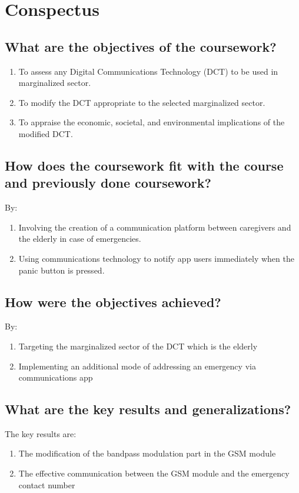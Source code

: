 \section{Conspectus}
\label{sec:cnspcts}

\IEEEpubidadjcol %

\subsection{What are the objectives of the coursework?}
\begin{enumerate}
	\item To assess any Digital Communications Technology (DCT) to be used in marginalized sector.
	\item To modify the DCT appropriate to the selected marginalized sector.
	\item To appraise the economic, societal, and environmental implications of the modified DCT.
\end{enumerate}	

\subsection{How does the coursework fit with the course and previously done coursework?}
By:
\begin{enumerate}
	\item Involving the creation of a communication platform between caregivers and the elderly in case of emergencies.
	\item Using communications technology to notify app users immediately when the panic button is pressed.
\end{enumerate}	

\subsection{How were the objectives achieved?}
By:
\begin{enumerate}
	\item Targeting the marginalized sector of the DCT which is the elderly
	\item Implementing an additional mode of addressing an emergency via communications app
\end{enumerate}

\subsection{What are the key results and generalizations?}
The key results are:
\begin{enumerate}
	\item The modification of the bandpass modulation part in the GSM module
	\item The effective communication between the GSM module and the emergency contact number
\end{enumerate}

